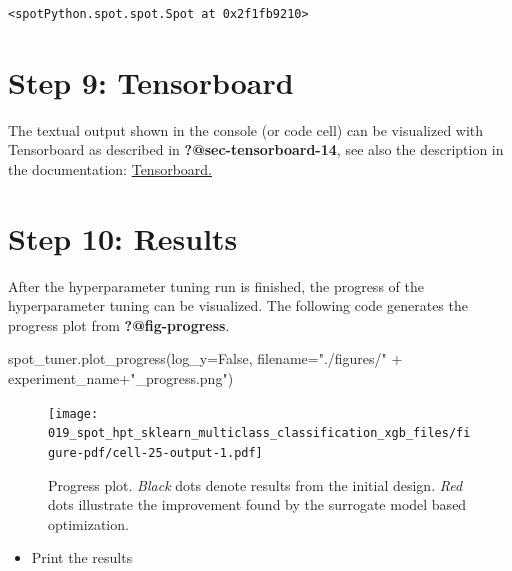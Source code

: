 \documentclass[
  letterpaper,
  DIV=11,
  numbers=noendperiod]{scrreprt}
\newenvironment{Shaded}{\begin{snugshade}}{\end{snugshade}}
\newcommand{\NormalTok}[1]{\textcolor[rgb]{0.00,0.23,0.31}{#1}}
\newcommand{\OperatorTok}[1]{\textcolor[rgb]{0.37,0.37,0.37}{#1}}
\newcommand{\StringTok}[1]{\textcolor[rgb]{0.13,0.47,0.30}{#1}}
\newcommand{\VariableTok}[1]{\textcolor[rgb]{0.07,0.07,0.07}{#1}}
\providecommand{\tightlist}{%
  \setlength{\itemsep}{0pt}\setlength{\parskip}{0pt}}\usepackage{longtable,booktabs,array}
\begin{document}
\begin{verbatim}
<spotPython.spot.spot.Spot at 0x2f1fb9210>
\end{verbatim}

\hypertarget{sec-tensorboard-17}{%
\section{Step 9: Tensorboard}\label{sec-tensorboard-17}}

The textual output shown in the console (or code cell) can be visualized
with Tensorboard as described in \textbf{?@sec-tensorboard-14}, see also
the description in the documentation:
\href{https://sequential-parameter-optimization.github.io/spotPython/14_spot_ray_hpt_torch_cifar10.html\#sec-tensorboard-14}{Tensorboard.}

\hypertarget{sec-results-tuning-17}{%
\section{Step 10: Results}\label{sec-results-tuning-17}}

After the hyperparameter tuning run is finished, the progress of the
hyperparameter tuning can be visualized. The following code generates
the progress plot from \textbf{?@fig-progress}.

\begin{Shaded}
\begin{Highlighting}[]
\NormalTok{spot\_tuner.plot\_progress(log\_y}\OperatorTok{=}\VariableTok{False}\NormalTok{,}
\NormalTok{    filename}\OperatorTok{=}\StringTok{"./figures/"} \OperatorTok{+}\NormalTok{ experiment\_name}\OperatorTok{+}\StringTok{"\_progress.png"}\NormalTok{)}
\end{Highlighting}
\end{Shaded}

\begin{figure}[H]

{\centering \texttt{[image: 019\_spot\_hpt\_sklearn\_multiclass\_classification\_xgb\_files/figure-pdf/cell-25-output-1.pdf]}

}

\caption{Progress plot. \emph{Black} dots denote results from the
initial design. \emph{Red} dots illustrate the improvement found by the
surrogate model based optimization.}

\end{figure}

\begin{itemize}
\tightlist
\item
  Print the results
\end{itemize}
\end{document}
